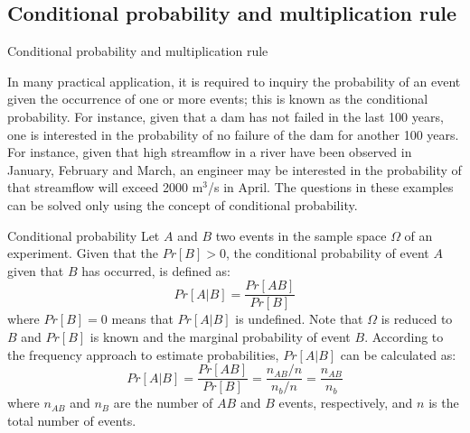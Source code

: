 \documentclass[8pt]{beamer}
\renewcommand{\emph}[1]{\textcolor{myorange}{#1}}
\begin{document}
\subsection{Conditional probability and multiplication rule}
\begin{frame}{Conditional probability and multiplication rule}
    
    In many practical application, it is required to inquiry the probability of an event given the occurrence of one or more events; this is known as the \emph{conditional probability}. For instance, given that a dam has not failed in the last 100 years, one is interested in the probability of no failure of the dam for another 100 years. For instance, given that high streamflow in a river have been observed in January, February and March, an engineer may be interested in the probability of that streamflow will exceed 2000 m$^3$/s in April. The questions in these examples can be solved only using the concept of \emph{conditional probability}. 
    \begin{block}{Conditional probability}
        Let $A$ and $B$ two events in the sample space $\Omega$ of an experiment. Given that the $Pr[B] > 0$, the \emph{conditional probability} of event $A$ given that $B$ has occurred, is defined as:
        $$
        Pr[A | B] = \frac{Pr[AB]}{Pr[B]}
        $$
        where $Pr[B] = 0$ means that $Pr[A | B]$ is undefined. Note that $\Omega$ is reduced to $B$ and $Pr[B]$ is known and the \emph{marginal probability} of event $B$. According to the frequency approach to estimate probabilities, $Pr[A | B]$ can be calculated as:
        $$
        Pr[A | B] = \frac{Pr[AB]}{Pr[B]} = \frac{n_{AB} /n}{n_b /n} = \frac{n_{AB}}{n_b}
        $$
        where $n_{AB}$ and $n_B$ are the number of $AB$ and $B$ events, respectively, and $n$ is the total number of events. 
    \end{block}
\end{frame}
\end{document}
